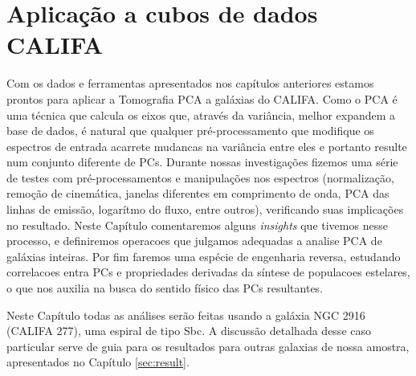 



\chapter{Aplicação a cubos de dados CALIFA}
\label{sec:PCAaplic}


Com os dados e ferramentas apresentados nos capítulos anteriores estamos
prontos para aplicar a Tomografia PCA a galáxias do CALIFA. Como o PCA é uma técnica que calcula os eixos que, através da variância,
melhor expandem a base de dados, é natural que qualquer pré-processamento que modifique os espectros de entrada acarrete mudancas na variância entre eles e portanto resulte num conjunto diferente de PCs. 
Durante nossas investigações fizemos uma série de testes com pré-processamentos e
manipulações nos espectros (normalização, remoção de cinemática, janelas diferentes em comprimento de onda, PCA das
linhas de emissão, logarítmo do fluxo, entre outros), verificando suas implicações no resultado. Neste Capítulo
comentaremos alguns {\em insights} que tivemos nesse processo, e definiremos operacoes que julgamos adequadas a analise PCA de galáxias inteiras. 
Por fim faremos uma espécie de engenharia reversa, 
estudando correlacoes entra PCs e propriedades derivadas da síntese de populacoes estelares, o que nos auxilia na busca do sentido
físico das PCs resultantes. 

Neste Capítulo todas as análises serão feitas usando a galáxia NGC 2916 (CALIFA 277), uma espiral de tipo Sbc. 
A discussão detalhada desse caso particular serve de guia para os resultados para outras galaxias de nossa amostra, apresentados
no
Capítulo \ref{sec:result}.

